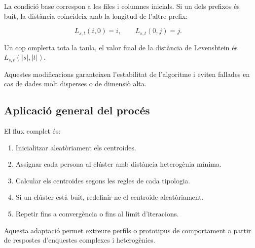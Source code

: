 \documentclass[a4paper,11pt]{article}
\begin{document}
\begin{itemize}
La condició base correspon a les files i columnes inicials. Si un dels
prefixos és buit, la distància coincideix amb la longitud de l’altre prefix:

\[
L_{s,t}(i,0) = i, \qquad
L_{s,t}(0,j) = j.
\]

Un cop omplerta tota la taula, el valor final de la distància de
Levenshtein és $L_{s,t}(|s|,|t|)$.
\end{itemize}

Aquestes modificacions garanteixen l’estabilitat de l’algoritme i eviten fallades en cas de dades molt disperses o de dimensiò alta.

\subsection{Aplicació general del procés}

El flux complet és:

\begin{enumerate}
  \item Inicialitzar aleatòriament els centroides.
  \item Assignar cada persona al clúster amb distància heterogènia mínima.
  \item Calcular els centroides segons les regles de cada tipologia.
  \item Si un clúster està buit, redefinir-ne el centroide aleatòriament.
  \item Repetir fins a convergència o fins al límit d'iteracions.
\end{enumerate}

Aquesta adaptació permet extreure perfils o prototipus de comportament
a partir de respostes d’enquestes complexes i heterogènies.
\end{document}
